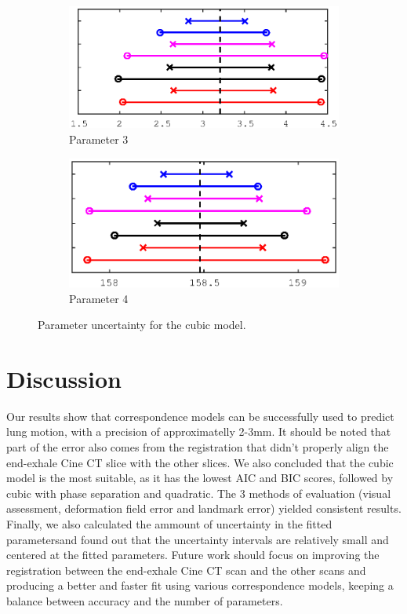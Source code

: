 \documentclass[11pt,a4paper,oneside]{report}
\begin{document}
\begin{figure}
  \begin{subfigure}[b]{0.5\textwidth}
    \includegraphics[width=\textwidth, trim=0 0 0 0,clip=true]{figures/task5/uncert_model3_param3.eps}
    \caption{Parameter 3}
  \end{subfigure}%
  \begin{subfigure}[b]{0.5\textwidth}
    \includegraphics[width=\textwidth, trim=0 0 0 0,clip=true]{figures/task5/uncert_model3_param4.eps}
    \caption{Parameter 4}
  \end{subfigure}%
  
  \caption{Parameter uncertainty for the cubic model.}
  \label{fig:c5uncertM3}
  
\end{figure}

\section*{Discussion}
Our results show that correspondence models can be successfully used to predict lung motion, with a precision of approximatelly 2-3mm. It should be noted that part of the error also comes from the registration that didn't properly align the end-exhale Cine CT slice with the other slices. We also concluded that the cubic model is the most suitable, as it has the lowest AIC and BIC scores, followed by cubic with phase separation and quadratic. The 3 methods of evaluation (visual assessment, deformation field error and landmark error) yielded consistent results. Finally, we also calculated the ammount of uncertainty in the fitted parametersand found out that the uncertainty intervals are relatively small and centered at the fitted parameters. Future work should focus on improving the registration between the end-exhale Cine CT scan and the other scans and producing a better and faster fit using various correspondence models, keeping a balance between accuracy and the number of parameters.
\end{document}
